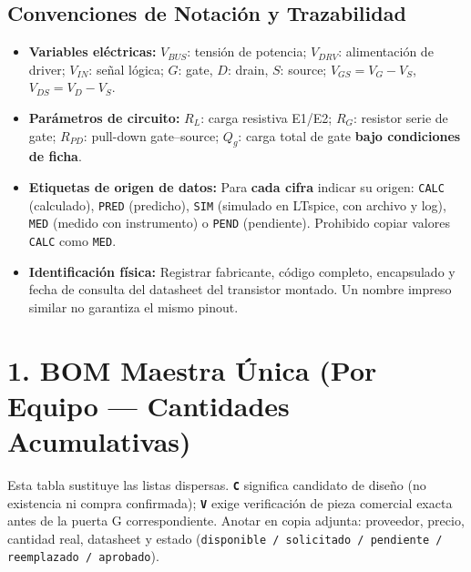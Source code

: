 \documentclass[10pt, a4paper, landscape]{article}
\begin{document}
\subsection*{Convenciones de Notación y Trazabilidad}
\begin{itemize}[noitemsep, topsep=2pt]
    \item \textbf{Variables eléctricas:} $V_{BUS}$: tensión de potencia; $V_{DRV}$: alimentación de driver; $V_{IN}$: señal lógica; $G$: gate, $D$: drain, $S$: source; $V_{GS} = V_G - V_S$, $V_{DS} = V_D - V_S$.
    \item \textbf{Parámetros de circuito:} $R_L$: carga resistiva E1/E2; $R_G$: resistor serie de gate; $R_{PD}$: pull-down gate--source; $Q_g$: carga total de gate \textbf{bajo condiciones de ficha}.
    \item \textbf{Etiquetas de origen de datos:} Para \textbf{cada cifra} indicar su origen: \texttt{CALC} (calculado), \texttt{PRED} (predicho), \texttt{SIM} (simulado en LTspice, con archivo y log), \texttt{MED} (medido con instrumento) o \texttt{PEND} (pendiente). Prohibido copiar valores \texttt{CALC} como \texttt{MED}.
    \item \textbf{Identificación física:} Registrar fabricante, código completo, encapsulado y fecha de consulta del datasheet del transistor montado. Un nombre impreso similar no garantiza el mismo pinout.
\end{itemize}

\newpage
\section*{1. BOM Maestra Única (Por Equipo — Cantidades Acumulativas)}
Esta tabla sustituye las listas dispersas. \textbf{\texttt{C}} significa candidato de diseño (no existencia ni compra confirmada); \textbf{\texttt{V}} exige verificación de pieza comercial exacta antes de la puerta G correspondiente. Anotar en copia adjunta: proveedor, precio, cantidad real, datasheet y estado (\texttt{disponible / solicitado / pendiente / reemplazado / aprobado}).
\end{document}
